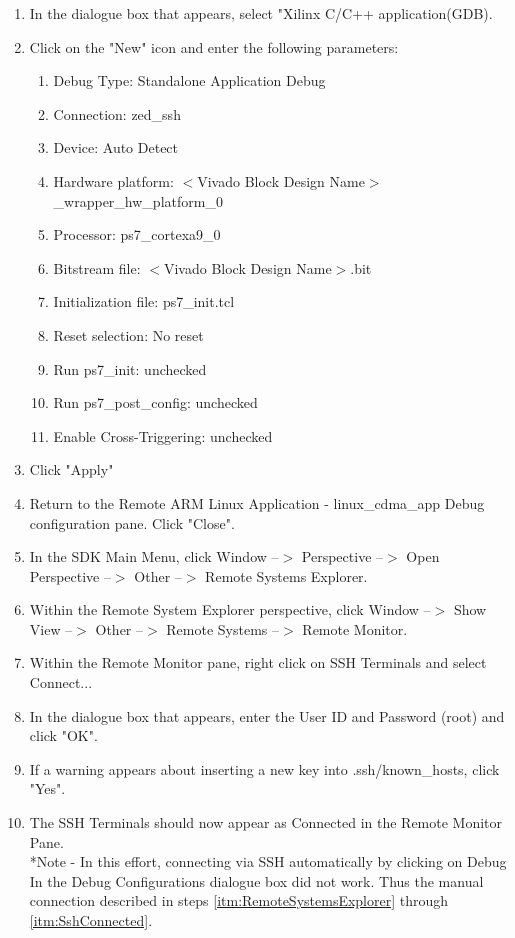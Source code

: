 \begin{enumerate}
\item In the dialogue box that appears, select "Xilinx C/C++ application(GDB).
\item Click on the "New" icon and enter the following parameters:
\begin{enumerate}
\item Debug Type: Standalone Application Debug
\item Connection: zed\_ssh %
\item Device: Auto Detect
\item Hardware platform: $<$Vivado Block Design Name$>$\_wrapper\_hw\_platform\_0
\item Processor: ps7\_cortexa9\_0
\item Bitstream file: $<$Vivado Block Design Name$>$.bit
\item Initialization file: ps7\_init.tcl
\item Reset selection: No reset
\item Run ps7\_init: unchecked
\item Run ps7\_post\_config: unchecked
\item Enable Cross-Triggering: unchecked
\end{enumerate}
\item Click "Apply"
\item Return to the Remote ARM Linux Application - linux\_cdma\_app Debug configuration pane.  Click "Close".
\item In the SDK Main Menu, click Window --$>$ Perspective --$>$ Open Perspective --$>$ Other --$>$ Remote Systems Explorer. \label{itm:RemoteSystemsExplorer}
\item Within the Remote System Explorer perspective, click Window --$>$ Show View --$>$ Other --$>$ Remote Systems --$>$ Remote Monitor.
\item Within the Remote Monitor pane, right click on SSH Terminals and select Connect...
\item In the dialogue box that appears, enter the User ID and Password (root) and click "OK".
\item If a warning appears about inserting a new key into .ssh/known\_hosts, click "Yes".
\item The SSH Terminals should now appear as Connected in the Remote Monitor Pane.\label{itm:SshConnected}
\\ *Note - In this effort, connecting via SSH automatically by clicking on Debug In the Debug Configurations dialogue box did not work.  Thus the manual connection described in steps \ref{itm:RemoteSystemsExplorer} through \ref{itm:SshConnected}.

\end{enumerate}
